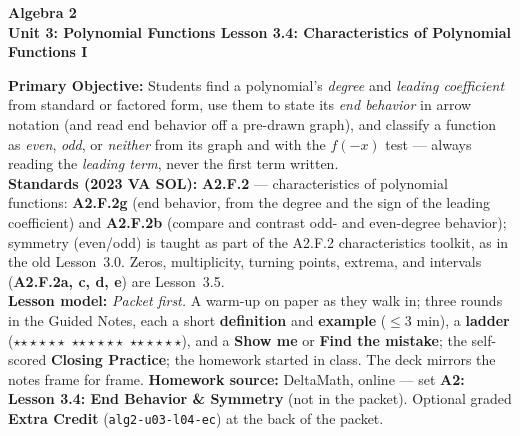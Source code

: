\documentclass[10pt]{article}
\newcommand{\CourseName}{Algebra 2}
\newcommand{\UnitNumberName}{Unit 3: Polynomial Functions \quad}
\newcommand{\LessonNumberName}{Lesson 3.4: Characteristics of Polynomial Functions I}
\newcommand{\rung}[1]{{\color{goldacc}\ifcase#1\or$\star$\or$\star\star$\or$\star\star\star$\fi}}
\begin{document}
\begin{center}
    {\Large\bfseries \CourseName \\
    {\small\bfseries \UnitNumberName \LessonNumberName}}
\end{center}

\begin{tcolorbox}[colback=forestbg, colframe=forest, boxrule=0.9pt, arc=2mm,
    left=2mm, right=2mm, top=1.5mm, bottom=1.5mm]
    \textbf{Primary Objective:} Students find a polynomial's \emph{degree} and \emph{leading
    coefficient} from standard or factored form, use them to state its \emph{end behavior} in
    arrow notation (and read end behavior off a pre-drawn graph), and classify a function as
    \emph{even}, \emph{odd}, or \emph{neither} from its graph and with the $f(-x)$ test --- always
    reading the \emph{leading term}, never the first term written.
    \\[2pt]
    \textbf{Standards (2023 VA SOL):} \textbf{A2.F.2} --- characteristics of polynomial
    functions: \textbf{A2.F.2g} (end behavior, from the degree and the sign of the leading
    coefficient) and \textbf{A2.F.2b} (compare and contrast odd- and even-degree behavior);
    symmetry (even/odd) is taught as part of the A2.F.2 characteristics toolkit, as in the old
    Lesson~3.0. Zeros, multiplicity, turning points, extrema, and intervals
    (\textbf{A2.F.2a, c, d, e}) are Lesson~3.5.
    \\[2pt]
    \textbf{Lesson model:} \emph{Packet first.} A warm-up on paper as they walk in; three rounds
    in the Guided Notes, each a short \textbf{definition} and \textbf{example} ($\le$3 min), a
    \textbf{ladder} (\rung1\ \rung2\ \rung3), and a \textbf{Show me} or \textbf{Find the
    mistake}; the self-scored \textbf{Closing Practice}; the homework started in class. The deck
    mirrors the notes frame for frame. \textbf{Homework source:} DeltaMath, online --- set
    \textbf{A2: Lesson 3.4: End Behavior \& Symmetry} (not in the packet). Optional graded
    \textbf{Extra Credit} (\texttt{alg2-u03-l04-ec}) at the back of the packet.
\end{tcolorbox}
\end{document}
